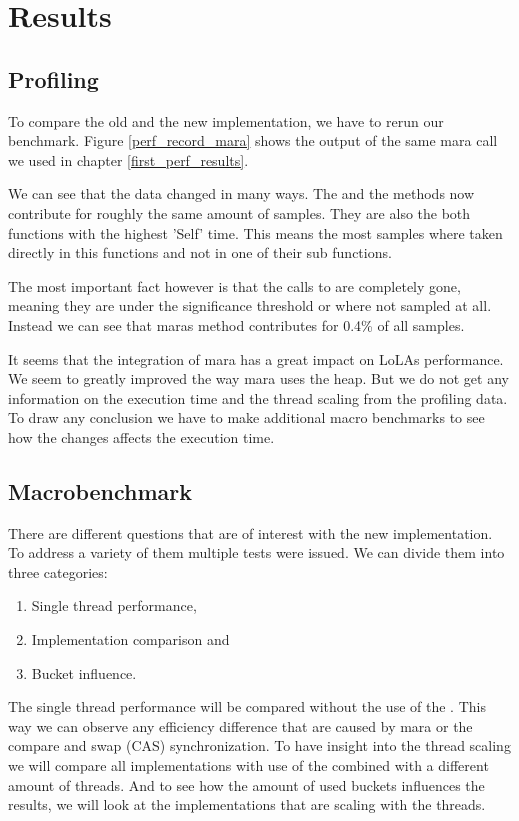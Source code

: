 \section{Results}
\subsection{Profiling}
To compare the old and the new implementation, we have to rerun our benchmark. Figure \ref{perf_record_mara} shows the output of the same mara call we used in chapter \ref{first_perf_results}.

We can see that the data changed in many ways. The  and the  methods now contribute for roughly the same amount of samples. They are also the both functions with the highest 'Self' time. This means the most samples where taken directly in this functions and not in one of their sub functions.

The most important fact however is that the calls to  are completely gone, meaning they are under the significance threshold or where not sampled at all. Instead we can see that maras  method contributes for 0.4\% of all samples.

It seems that the integration of mara has a great impact on LoLAs performance. We seem to greatly improved the way mara uses the heap. But we do not get any information on the execution time and the thread scaling from the profiling data. To draw any conclusion we have to make additional macro benchmarks to see how the changes affects the execution time.

\subsection{Macrobenchmark}

There are different questions that are of interest with the new implementation. To address a variety of them multiple tests were issued. We can divide them into three categories:
\begin{enumerate}
    \item Single thread performance,
    \item Implementation comparison and
    \item Bucket influence.
\end{enumerate}
The single thread performance will be compared without the use of the . This way we can observe any efficiency difference that are caused by mara or the compare and swap (CAS) synchronization.
To have insight into the thread scaling we will compare all implementations with use of the  combined with a different amount of threads.
And to see how the amount of used buckets influences the results, we will look at the implementations that are scaling with the threads.

